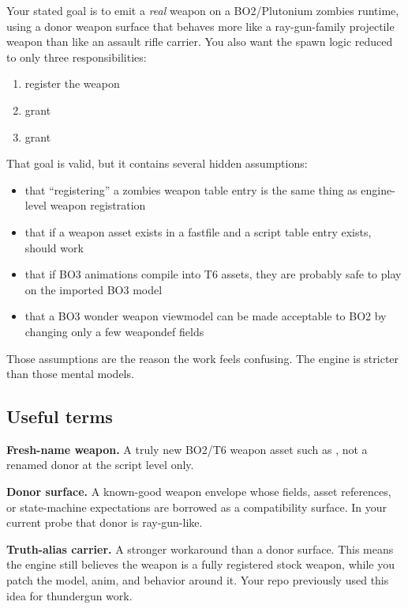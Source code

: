 \documentclass[11pt]{article}
\begin{document}
Your stated goal is to emit a \emph{real}  weapon on a BO2/Plutonium zombies runtime, using a donor weapon surface that behaves more like a ray-gun-family projectile weapon than like an assault rifle carrier. You also want the spawn logic reduced to only three responsibilities:

\begin{enumerate}
  \item register the weapon
  \item grant 
  \item grant 
\end{enumerate}

That goal is valid, but it contains several hidden assumptions:

\begin{itemize}
  \item that ``registering'' a zombies weapon table entry is the same thing as engine-level weapon registration
  \item that if a weapon asset exists in a fastfile and a script table entry exists,  should work
  \item that if BO3 animations compile into T6  assets, they are probably safe to play on the imported BO3 model
  \item that a BO3 wonder weapon viewmodel can be made acceptable to BO2 by changing only a few weapondef fields
\end{itemize}

Those assumptions are the reason the work feels confusing. The engine is stricter than those mental models.

\subsection{Useful terms}

\textbf{Fresh-name weapon.} A truly new BO2/T6 weapon asset such as , not a renamed donor at the script level only.

\textbf{Donor surface.} A known-good weapon envelope whose fields, asset references, or state-machine expectations are borrowed as a compatibility surface. In your current probe that donor is ray-gun-like.

\textbf{Truth-alias carrier.} A stronger workaround than a donor surface. This means the engine still believes the weapon is a fully registered stock weapon, while you patch the model, anim, and behavior around it. Your repo previously used this idea for thundergun work.
\end{document}
